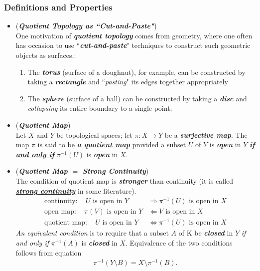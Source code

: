 \documentclass[11pt]{article}
\begin{document}
\subsubsection{Definitions and Properties}
\begin{itemize}
\item \begin{remark} (\emph{\textbf{Quotient Topology as ``Cut-and-Paste"}})\\
One motivation of \emph{\textbf{quotient topology}} comes from geometry, where one often has occasion to use ``\emph{\textbf{cut-and-paste}}" techniques to construct such geometric objects as surfaces.:
\begin{enumerate}
\item The \emph{\textbf{torus}} (surface of a doughnut), for example, can be constructed by taking a \emph{\textbf{rectangle}} and ``\emph{pasting}" its edges together appropriately
\item The \emph{\textbf{sphere}} (surface of a ball) can be constructed by taking a \emph{\textbf{disc}} and \emph{collapsing} its entire boundary to a single point;  
\end{enumerate}
\end{remark}

\item \begin{definition} (\emph{\textbf{Quotient Map}})\\
Let $X$ and $Y$ be topological spaces; let $\pi : X \rightarrow Y$ be a \emph{\textbf{surjective map}}. The map $\pi$ is said to be \underline{\emph{\textbf{a quotient map}}} provided a subset $U$ of $Y$ is \emph{\textbf{open}} in $Y$ \underline{\emph{\textbf{if and only if}}} $\pi^{-1}(U)$ is \emph{\textbf{open}} in $X$.
\end{definition}

\item \begin{remark}(\emph{\textbf{Quotient Map $=$ Strong Continuity}})\\
The condition of quotient map is \emph{\textbf{stronger}} than continuity (it is called \underline{\emph{\textbf{strong continuity}}} in some literature). 
\begin{align*}
\text{continuity}: \quad U \text{ is open in }Y & \Rightarrow \pi^{-1}(U) \text{ is open in }X\\
\text{open map}: \quad \pi(V) \text{ is open in }Y & \Leftarrow V \text{ is open in }X\\
\text{quotient map}: \quad U \text{ is open in }Y & \Leftrightarrow \pi^{-1}(U) \text{ is open in }X
\end{align*}
\emph{An equivalent condition} is to require that a subset $A$ of K be \emph{\textbf{closed}} in $Y$ \emph{if and only if} $\pi^{-1}(A)$ is \emph{\textbf{closed}} in $X$. Equivalence of the two conditions follows from equation
\begin{align*}
\pi^{-1}(Y \setminus B) = X \setminus \pi^{-1}(B).
\end{align*}
\end{remark}


\end{itemize}
\end{document}
